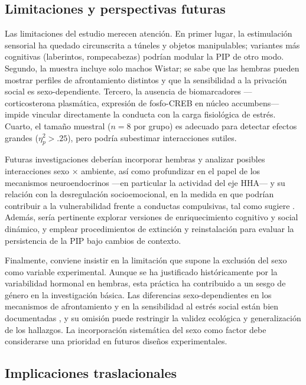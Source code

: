\documentclass[12pt,a4paper]{article}
\begin{document}
\begin{multicols}{2}
\subsection*{Limitaciones y perspectivas futuras}

Las limitaciones del estudio merecen atención. En primer lugar, la estimulación sensorial ha quedado circunscrita a túneles y objetos manipulables; variantes más cognitivas (laberintos, rompecabezas) podrían modular la PIP de otro modo. Segundo, la muestra incluye solo machos Wistar; se sabe que las hembras pueden mostrar perfiles de afrontamiento distintos y que la sensibilidad a la privación social es sexo-dependiente. Tercero, la ausencia de biomarcadores —corticosterona plasmática, expresión de fosfo-CREB en núcleo accumbens— impide vincular directamente la conducta con la carga fisiológica de estrés. Cuarto, el tamaño muestral ($n = 8$ por grupo) es adecuado para detectar efectos grandes ($\eta^2_p > .25$), pero podría subestimar interacciones sutiles.

Futuras investigaciones deberían incorporar hembras y analizar posibles interacciones sexo × ambiente, así como profundizar en el papel de los mecanismos neuroendocrinos —en particular la actividad del eje HHA— y su relación con la desregulación socioemocional, en la medida en que podrían contribuir a la vulnerabilidad frente a conductas compulsivas, tal como sugiere \citet{MartinGonzalez2022}. Además, sería pertinente explorar versiones de enriquecimiento cognitivo y social dinámico, y emplear procedimientos de extinción y reinstalación para evaluar la persistencia de la PIP bajo cambios de contexto.

Finalmente, conviene insistir en la limitación que supone la exclusión del sexo como variable experimental. Aunque se ha justificado históricamente por la variabilidad hormonal en hembras, esta práctica ha contribuido a un sesgo de género en la investigación básica. Las diferencias sexo-dependientes en los mecanismos de afrontamiento y en la sensibilidad al estrés social están bien documentadas \citep{Bowman2006, Barha2011}, y su omisión puede restringir la validez ecológica y generalización de los hallazgos. La incorporación sistemática del sexo como factor debe considerarse una prioridad en futuros diseños experimentales.


\subsection*{Implicaciones traslacionales}


\end{multicols}
\end{document}
